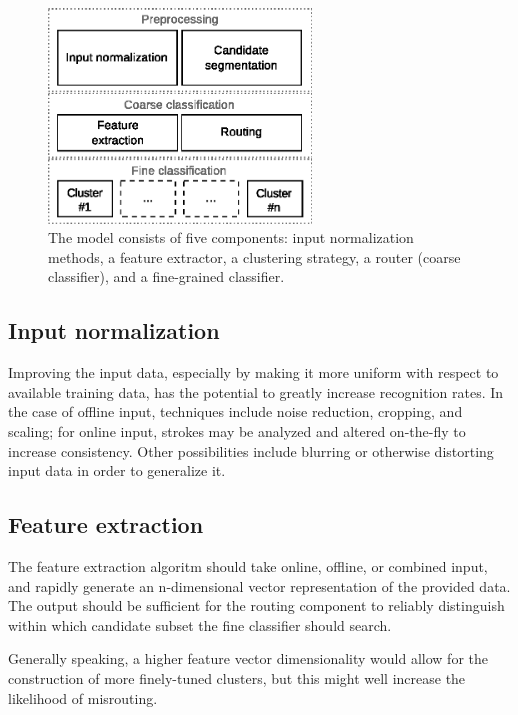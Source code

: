 \documentclass[10pt,conference,a4paper]{IEEEtran}
\begin{document}
	\begin{figure}[b]
		\centering
		\includegraphics[width=2.75in]{./fig/model-overview.eps}
		\caption{The model consists of five components: input normalization methods, a feature extractor,
			a clustering strategy, a router (coarse classifier), and a fine-grained classifier.}
		\label{fig_model_overview}
	\end{figure}


	
	\subsection{Input normalization}

	Improving the input data, especially by making it more uniform with respect to available training data, has the potential
	to greatly increase recognition rates. In the case of offline input, techniques include noise reduction,
	cropping, and scaling; for online input, strokes may be analyzed and altered on-the-fly to increase consistency.
	Other possibilities include blurring or otherwise distorting input data in order to generalize it. \cite{razzak2009combining}



	\subsection{Feature extraction}

	The feature extraction algoritm should take online, offline, or combined input, and rapidly generate
	an n-dimensional vector representation of the provided data. The output should be sufficient for the
	routing component to reliably distinguish within which candidate subset the fine classifier should search.

	Generally speaking, a higher feature vector dimensionality would allow for the construction of more finely-tuned clusters,
	but this might well increase the likelihood of misrouting.%
\end{document}
